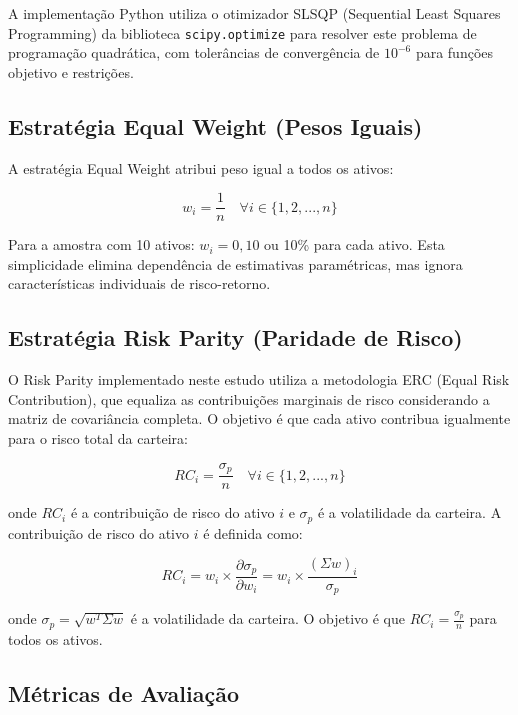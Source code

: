 A implementação Python utiliza o otimizador SLSQP (Sequential Least Squares Programming) da biblioteca \texttt{scipy.optimize} para resolver este problema de programação quadrática, com tolerâncias de convergência de $10^{-6}$ para funções objetivo e restrições.

\subsection{Estratégia Equal Weight (Pesos Iguais)}

A estratégia Equal Weight atribui peso igual a todos os ativos:

\begin{equation}
w_i = \frac{1}{n} \quad \forall i \in \{1, 2, ..., n\}
\end{equation}

Para a amostra com 10 ativos: $w_i = 0,10$ ou 10\% para cada ativo. Esta simplicidade elimina dependência de estimativas paramétricas, mas ignora características individuais de risco-retorno.

\subsection{Estratégia Risk Parity (Paridade de Risco)}

O Risk Parity implementado neste estudo utiliza a metodologia ERC (Equal Risk Contribution), que equaliza as contribuições marginais de risco considerando a matriz de covariância completa. O objetivo é que cada ativo contribua igualmente para o risco total da carteira:

\begin{equation}
RC_i = \frac{\sigma_p}{n} \quad \forall i \in \{1, 2, ..., n\}
\end{equation}

onde $RC_i$ é a contribuição de risco do ativo $i$ e $\sigma_p$ é a volatilidade da carteira. A contribuição de risco do ativo $i$ é definida como:

\begin{equation}
RC_i = w_i \times \frac{\partial \sigma_p}{\partial w_i} = w_i \times \frac{(\Sigma w)_i}{\sigma_p}
\end{equation}

onde $\sigma_p = \sqrt{w^T \Sigma w}$ é a volatilidade da carteira. O objetivo é que $RC_i = \frac{\sigma_p}{n}$ para todos os ativos.

\subsection{Métricas de Avaliação}

